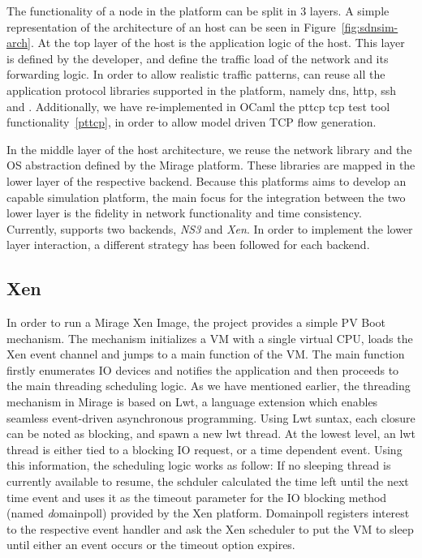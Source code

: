 The functionality of a node in the \sdnsim platform can be split in 3 layers.  A
simple representation of the architecture of an \sdnsim host can be seen in
Figure~\ref{fig:sdnsim-arch}.  At the top layer of the host is the application
logic of the host. This layer is defined by the developer, and define the
traffic load of the network and its forwarding logic. In order to allow
realistic traffic patterns, \sdnsim can reuse all the application protocol libraries
supported in the \mirage platform, namely dns, http, ssh and \of. Additionally,
we have re-implemented in OCaml the pttcp tcp test tool functionality~\ref{pttcp},
in order to allow model driven TCP flow generation. 

In the middle layer of the host architecture, we reuse the network library and
the OS abstraction defined by the Mirage platform. These libraries are mapped in
the lower layer of the respective backend. Because this platforms aims to
develop an \of capable simulation platform, the main focus for the integration
between the two lower layer is the fidelity in network functionality and time
consistency. Currently, \sdnsim supports two backends, {\it NS3} and {\it Xen}.
In order to implement the lower layer interaction, a different strategy has been 
followed for each backend. 

\subsection{Xen}

In order to run a Mirage Xen Image, the project provides a simple PV Boot
mechanism. The mechanism initializes a VM with a single virtual CPU, loads the
Xen event channel and jumps to a main function of the VM. The main function
firstly enumerates IO devices and notifies the application and then proceeds to the
main threading scheduling logic. As we have mentioned earlier, the threading
mechanism in Mirage is based on Lwt, a language extension which enables seamless
event-driven asynchronous programming. Using Lwt suntax, each closure can be
noted as blocking, and spawn a new lwt thread. At the lowest level, an lwt
thread is either tied to a blocking IO request, or a time dependent event. Using
this information, the scheduling logic works as follow: If no sleeping thread
is currently available to resume, the schduler calculated the
time left until the next time event and uses it as the timeout parameter for the
IO blocking method (named {\emph domainpoll}) provided by the Xen platform.
Domainpoll registers interest to the respective event handler and ask the Xen
scheduler to put the VM to sleep until either an event occurs or the timeout
option expires.

